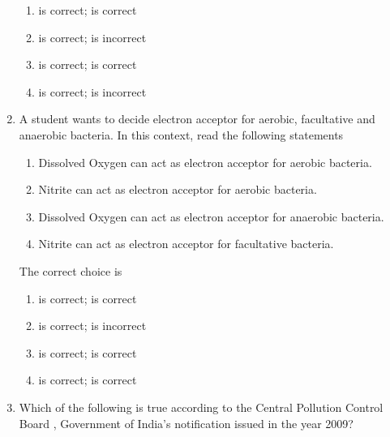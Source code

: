 \documentclass[journal,12pt,onecolumn]{IEEEtran}
\theoremstyle{remark}
\begin{document}
\begin{enumerate}
\begin{enumerate}
\item {} is correct;  is correct
\item {} is correct;  is incorrect
\item {} is correct;  is correct
\item {} is correct;  is incorrect
\end{enumerate}
\hfill{}

\item A student wants to decide electron acceptor for aerobic, facultative and anaerobic bacteria. In this context, read the following statements

\begin{enumerate}[label=\roman*.]
\item Dissolved Oxygen  can act as electron acceptor for aerobic bacteria.
\item Nitrite can act as electron acceptor for aerobic bacteria.
\item Dissolved Oxygen  can act as electron acceptor for anaerobic bacteria.
\item Nitrite can act as electron acceptor for facultative bacteria.
\end{enumerate}

The correct choice is

\begin{enumerate}
\item {} is correct;  is correct
\item {} is correct;  is incorrect
\item {} is correct;  is correct
\item {} is correct;  is correct
\end{enumerate}
\hfill{}

\newpage

\item Which of the following is true according to the Central Pollution Control Board , Government of India's notification issued in the year 2009?


\end{enumerate}
\end{document}
